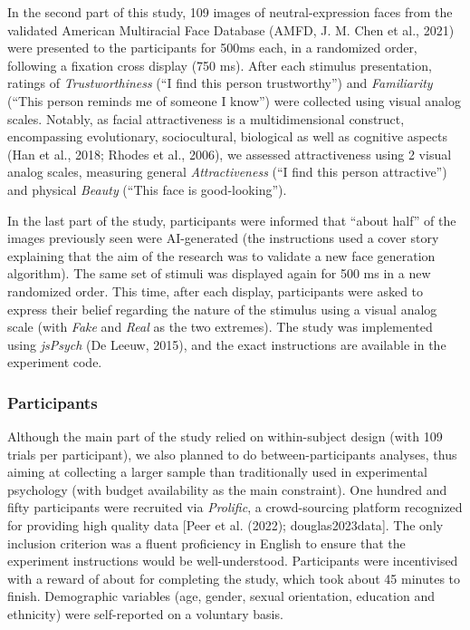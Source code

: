 \documentclass[
  man,floatsintext]{apa6}
\begin{document}
In the second part of this study, 109 images of neutral-expression faces from the validated American Multiracial Face Database
(AMFD, J. M. Chen et al., 2021)
were presented to the participants for 500ms each, in a randomized order, following a fixation cross display (750 ms). After each stimulus presentation, ratings of \emph{Trustworthiness} (``I find this person trustworthy'') and \emph{Familiarity} (``This person reminds me of someone I know'') were collected using visual analog scales. Notably, as facial attractiveness is a multidimensional construct, encompassing evolutionary, sociocultural, biological as well as cognitive aspects (Han et al., 2018; Rhodes et al., 2006), we assessed attractiveness using 2 visual analog scales, measuring general \emph{Attractiveness} (``I find this person attractive'') and physical \emph{Beauty} (``This face is good-looking'').

In the last part of the study, participants were informed that ``about half'' of the images previously seen were AI-generated (the instructions used a cover story explaining that the aim of the research was to validate a new face generation algorithm). The same set of stimuli was displayed again for 500 ms in a new randomized order. This time, after each display, participants were asked to express their belief regarding the nature of the stimulus using a visual analog scale (with \emph{Fake} and \emph{Real} as the two extremes). The study was implemented using \emph{jsPsych} (De Leeuw, 2015), and the exact instructions are available in the experiment code.

\hypertarget{participants}{%
\subsubsection{Participants}\label{participants}}

Although the main part of the study relied on within-subject design (with 109 trials per participant), we also planned to do between-participants analyses, thus aiming at collecting a larger sample than traditionally used in experimental psychology (with budget availability as the main constraint). One hundred and fifty participants were recruited via \emph{Prolific}, a crowd-sourcing platform recognized for providing high quality data {[}Peer et al. (2022); douglas2023data{]}. The only inclusion criterion was a fluent proficiency in English to ensure that the experiment instructions would be well-understood. Participants were incentivised with a reward of about  for completing the study, which took about 45 minutes to finish. Demographic variables (age, gender, sexual orientation, education and ethnicity) were self-reported on a voluntary basis.
\end{document}
